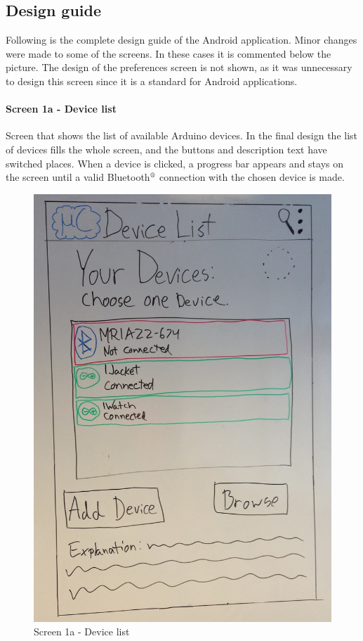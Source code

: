 \subsection{Design guide}
Following is the complete design guide of the Android application. Minor changes were made to some of the screens. In these cases it is commented below the picture. The design of the preferences screen is not shown, as it was unnecessary to design this screen since it is a standard for Android applications.

\paragraph{Screen 1a - Device list}
Screen that shows the list of available Arduino devices. In the final design the list of devices fills the whole screen, and the buttons and description text have switched places. When a device is clicked, a progress bar appears and stays on the screen until a valid Bluetooth$\textsuperscript{\textregistered}$ connection with the chosen device is made.

\begin{figure}[H]
	\centering
		\includegraphics[scale=0.2]{images/Design_guide/Screen1a.png}
	\caption{Screen 1a - Device list}
	\label{fig:screen1a}
\end{figure}


